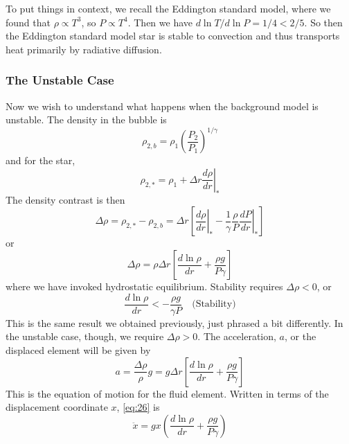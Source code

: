 \documentclass[10pt]{article}
\numberwithin{equation}{section}
\newcommand{\n}{\noindent}
\begin{document}
\n To put things in context, we recall the Eddington standard model,
where we found that $\rho\propto T^3$, so $P\propto T^4$. Then we have
$d\ln T/d\ln P=1/4<2/5$. So then the Eddington standard model star is
stable to convection and thus transports heat primarily by radiative
diffusion.
\subsubsection{The Unstable Case}
\label{sec:unstable-case}

Now we wish to understand what happens when the background model is
unstable. The density in the bubble is
\begin{equation}
  \label{eq:21}
  \rho_{2,b}=\rho_1\left(\frac{P_2}{P_1}\right)^{1/\gamma}
\end{equation}
and for the star,
\begin{equation}
  \label{eq:22}
  \rho_{2,*}=\rho_1+\left.\Delta r\frac{d\rho}{dr}\right|_*
\end{equation}
The density contrast is then
\begin{equation}
  \label{eq:23}
  \Delta \rho=\rho_{2,*}-\rho_{2,b}=\Delta r\left[\left.\frac{d\rho}{dr}
\right|_*-\frac{1}{\gamma}\frac{\rho}{P}\left.\frac{dP}{dr}\right|_*\right]
\end{equation}
or
\begin{equation}
  \label{eq:24}
  \Delta\rho=\rho\Delta r\left[\frac{d\ln\rho}{dr}+\frac{\rho g}{P\gamma}
\right]
\end{equation}
where we have invoked hydrostatic equilibrium. Stability requires
$\Delta\rho<0$, or
\begin{equation}
  \label{eq:25}
  \boxed{\frac{d\ln\rho}{dr}<-\frac{\rho g}{\gamma P}\quad\textrm
{(Stability)}}
\end{equation}
This is the same result we obtained previously, just phrased a bit
differently. In the unstable case, though, we require $\Delta\rho>0$. The
acceleration, $a$, or the displaced element will be given by 
\begin{equation}
  \label{eq:26}
  a=\frac{\Delta\rho}{\rho}g=g\Delta
  r\left[\frac{d\ln\rho}{dr}+\frac{\rho g}{P\gamma}\right]
\end{equation}
This is the equation of motion for the fluid element. Written in
terms of the displacement coordinate $x$, \eqref{eq:26} is
\begin{equation}
  \label{eq:27}
  \ddot{x}=gx\left(\frac{d\ln\rho}{dr}+\frac{\rho g}{P\gamma}\right)
\end{equation}
\end{document}

